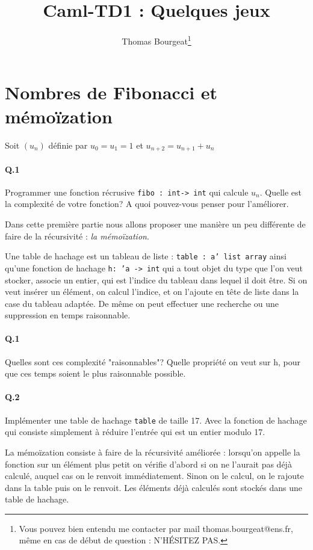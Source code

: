 \documentclass[10pt,a4paper]{article}
\begin{document}
\title{Caml-TD1 : Quelques jeux}
\author{Thomas Bourgeat\footnote{Vous pouvez bien entendu me contacter par mail thomas.bourgeat@ens.fr, même en cas de début de question : N'HÉSITEZ PAS.}}
\maketitle{}

\section{Nombres de Fibonacci et mémoïzation}
Soit $(u_n)$ définie par $u_0=u_1=1$ et $u_{n+2}=u_{n+1}+u_n$
\paragraph{Q.1} Programmer une fonction récrusive \texttt{fibo : int-> int} qui calcule $u_n$. Quelle est la complexité de votre fonction? A quoi pouvez-vous penser pour l'améliorer.

Dans cette première partie nous allons proposer une manière un peu différente de faire de la récursivité : \emph{la mémoïzation}.

Une table de hachage est un tableau de liste : \texttt{table : a' list array} ainsi qu'une fonction de hachage \texttt{h: 'a -> int} qui a tout objet du type que l'on veut stocker, associe un entier, qui est l'indice du tableau dans lequel il doit être. Si on veut insérer un élément, on calcul l'indice, et on l'ajoute en tête de liste dans la case du tableau adaptée. De même on peut effectuer une recherche ou une suppression en temps raisonnable.

\paragraph{Q.1}Quelles sont ces complexité "raisonnables"? Quelle propriété on veut sur h, pour que ces temps soient le plus raisonnable possible.

\paragraph{Q.2} Implémenter une table de hachage \texttt{table} de taille 17. Avec la fonction de hachage qui consiste simplement à réduire l'entrée qui est un entier modulo 17.



La mémoïzation consiste à faire de la récursivité améliorée : lorsqu'on appelle la fonction sur un élément plus petit on vérifie d'abord si on ne l'aurait pas déjà calculé, auquel cas on le renvoit immédiatement. Sinon on le calcul, on le rajoute dans la table puis on le renvoit. Les éléments déjà calculés sont stockés dans une table de hachage.
\end{document}
